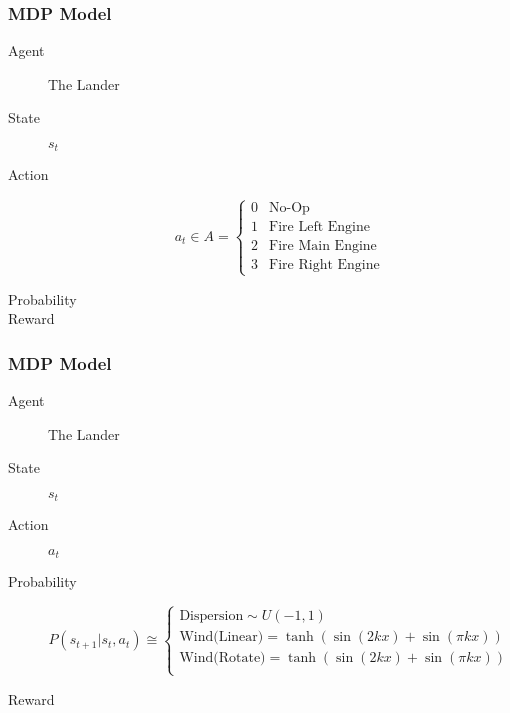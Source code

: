 \documentclass{beamer}
\begin{document}
\begin{frame}
    \frametitle{MDP Model}
    \begin{description}
        \item[Agent] The Lander
        \item[State] \(s_t\)
        \item[Action] 
            \[a_t \in A = 
                \begin{cases}
                    0 & \text{No-Op} \\
                    1 & \text{Fire Left Engine} \\
                    2 & \text{Fire Main Engine} \\
                    3 & \text{Fire Right Engine}
                \end{cases}
            \]
        \item[Probability] 
        \item[Reward] 
    \end{description}
\end{frame}

\begin{frame}
    \frametitle{MDP Model}
    \begin{description}
        \item[Agent] The Lander
        \item[State] \(s_t\)
        \item[Action] \(a_t\)
        \item[Probability] 
            \[P(s_{t+1}|s_t,a_t) \cong \begin{cases}
                \text{Dispersion} \sim U(-1,1) \\
                \text{Wind(Linear)} = \tanh(\sin(2 k x) + \sin(\pi k x)) \\
                \text{Wind(Rotate)} = \tanh(\sin(2 k x) + \sin(\pi k x)) \\
            \end{cases}\]
        \item[Reward] 
    \end{description}
\end{frame}
\end{document}
